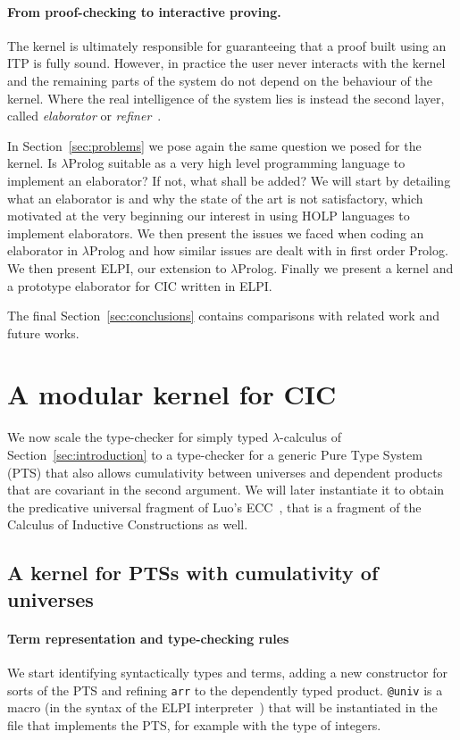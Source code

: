 \documentclass{easychair}
\begin{document}
\paragraph{From proof-checking to interactive proving.}

The kernel is ultimately responsible for guaranteeing that a proof
built using an ITP is fully sound. However, in practice the user never
interacts with the kernel and the remaining parts of the system do not
depend on the behaviour of the kernel. Where the real intelligence of
the system lies is instead the second layer, called \emph{elaborator}
or \emph{refiner}~\cite{??,bidir,??,??}.

In Section~\ref{sec:problems} we pose again the same question we posed for the kernel. Is $\lambda$Prolog suitable as a very high level programming language to implement an elaborator? If not, what shall be added?
We will start by detailing what an elaborator is and why the state of the art is not satisfactory, which motivated at the very beginning our interest in using HOLP languages to implement elaborators. We then present the issues we faced when coding an elaborator in $\lambda$Prolog and how similar issues are dealt with in first order Prolog. We then present ELPI, our extension to $\lambda$Prolog.  Finally we present a kernel and a prototype elaborator for CIC written in ELPI.

The final Section~\ref{sec:conclusions} contains comparisons with related work and future works.

\section{A modular kernel for CIC}\label{sec:kernel}

We now scale the type-checker for simply typed $\lambda$-calculus of Section~\ref{sec:introduction} to a type-checker for a generic Pure Type System (PTS) that also allows cumulativity between universes and dependent products that are covariant in the second argument. We will later instantiate it to obtain the predicative universal fragment of Luo's ECC~\cite{ecc}, that is a fragment of the Calculus of Inductive Constructions as well.

\subsection{A kernel for PTSs with cumulativity of universes}\label{sec:kernelpts}
\paragraph{Term representation and type-checking rules}
We start identifying syntactically types and terms, adding a new constructor for sorts of the PTS and refining \verb+arr+ to the dependently typed product.
\verb+@univ+ is a macro (in the syntax of the ELPI interpreter~\cite{elpiLPAR}) that will be instantiated in the file that implements the PTS, for example with the type of integers.
\end{document}
